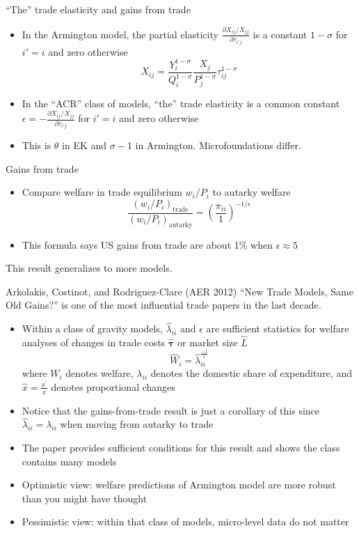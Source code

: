 \documentclass[10pt,notes=hide]{beamer}
\begin{document}
\begin{frame}{``The'' trade elasticity and gains from trade}
\begin{itemize}
	\item In the Armington model, the partial elasticity
$\frac{\partial X_{ij}/X_{jj}}{\partial \tau_{i'j}}$
is a constant
$1-\sigma$ for $i'=i$ and zero otherwise
\begin{equation*}
X_{ij}
= \frac{Y_i^{1-\sigma}}{Q_i^{1-\sigma}} \frac{X_j}{P_j^{1-\sigma}}\tau_{ij}^{1-\sigma} 
\end{equation*}
	\item In the ``ACR'' class of models,
``the'' trade elasticity is a common constant
$\epsilon = -\frac{\partial X_{ij}/X_{jj}}{\partial \tau_{i'j}}$ for $i'=i$ and zero otherwise
	\item This is $\theta$ in EK and $\sigma-1$ in Armington. Microfoundations differ.
\end{itemize}
Gains from trade
\begin{itemize}
	\item Compare welfare in trade equilibrium $w_i/P_i$ to autarky welfare
	$$
	\frac{(w_i / P_i)_{\text{trade}}}
	{(w_i / P_i)_{\text{autarky}}}
	=
	\left(\frac{\pi_{ii}}{1}\right)^{-1/\epsilon} 
	$$
	\item This formula says US gains from trade are about 1\% when $\epsilon\approx 5$
\end{itemize}
This result generalizes to more models.
\end{frame}
\begin{frame}{Arkolakis, Costinot, and Rodriguez-Clare (AER 2012)}
``New Trade Models, Same Old Gains?'' is one of the most influential trade papers in the last decade.
\begin{itemize}
\item Within a class of gravity models, $\widehat{\lambda}_{ii}$ and $\epsilon$ are sufficient statistics for welfare analyses of changes in trade costs $\hat{\mathbf{\tau}}$ or market size $\hat{L}$
\begin{equation*}
\widehat{W}_{i}=\widehat{\lambda}_{ii}^{\frac{-1}{\epsilon}}
\end{equation*}
where $W_{i}$ denotes welfare, $\lambda_{ii}$ denotes the domestic share of expenditure, and $\widehat{x}=\frac{x^{\prime}}{x}$ denotes proportional changes
\item Notice that the gains-from-trade result is just a corollary of this since $\widehat{\lambda}_{ii}=\lambda _{ii}$ when moving from autarky to trade
	\item The paper provides sufficient conditions for this result and shows the class contains many models
	\item Optimistic view: welfare predictions of Armington model are more robust than you might have thought
	\item Pessimistic view: within that class of models, micro-level data do not matter
\end{itemize}
\end{frame}
\end{document}
